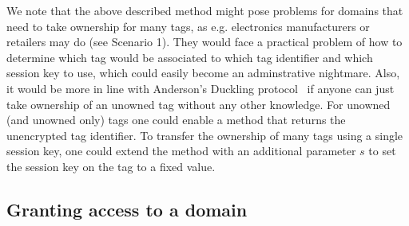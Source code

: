 We note that the above described method might pose problems for domains that
need to take ownership for many tags, as e.g. electronics manufacturers or
retailers may do (see Scenario 1). They would face a practical problem of how
to determine which tag would be associated to which tag identifier and which
session key to use, which could
easily become an adminstrative nightmare. Also, it would be more in line with
Anderson's Duckling protocol~\cite{StaA99,stajano2000duckling-what-next} if
anyone can just take ownership of an unowned tag without any other
knowledge. For unowned (and unowned only) tags one could enable a method
that returns the unencrypted tag identifier. To transfer the ownership of many
tags using a single session key, one could extend the method
 with an additional parameter $s$ to set the
session key on the tag to a fixed value.

\subsection{Granting access to a domain}
\label{ssec-grantingaccess}


